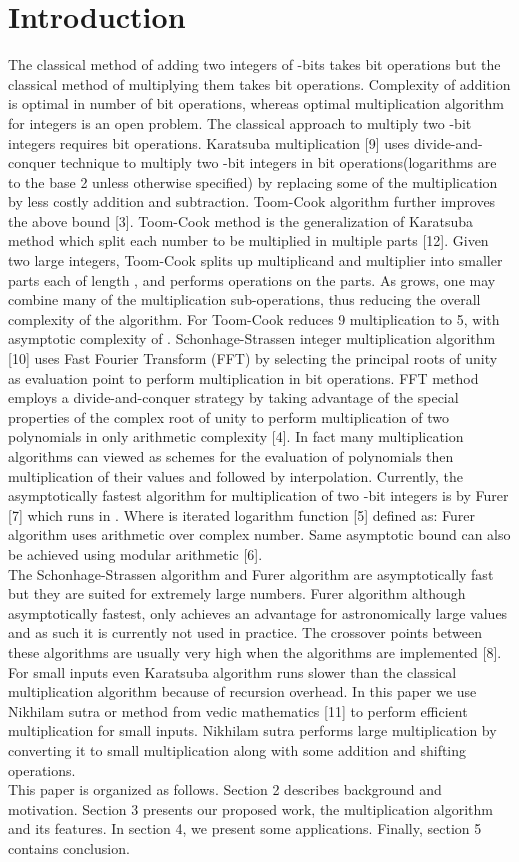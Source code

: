 \documentclass[conference]{IEEEtran}
\begin{document}
\section{Introduction}
The classical method of adding two integers of -bits takes  bit operations but the classical method of multiplying them takes  bit operations. Complexity of addition is optimal in number of bit operations, whereas optimal multiplication algorithm for integers is an open problem. The classical approach to multiply two -bit integers requires  bit operations. Karatsuba multiplication [9] uses divide-and-conquer technique to multiply two -bit integers in  bit operations(logarithms are to the base 2 unless otherwise specified) by replacing some of the multiplication by less costly addition and subtraction. Toom-Cook algorithm further improves the above bound [3]. Toom-Cook method is the generalization of Karatsuba method which split each number to be multiplied in multiple parts [12]. Given two large integers, Toom-Cook splits up multiplicand and multiplier into  smaller parts each of length , and performs operations on the parts. As  grows, one may combine many of the multiplication sub-operations, thus reducing the overall complexity of the algorithm. For  Toom-Cook reduces 9 multiplication to 5, with 
asymptotic complexity of . Schonhage-Strassen integer multiplication algorithm [10] uses Fast Fourier Transform (FFT) by selecting the principal roots of unity as evaluation point to perform multiplication in  bit operations. FFT method employs a divide-and-conquer strategy by taking advantage of the special properties of the complex root of unity to perform multiplication of two polynomials in only  arithmetic complexity [4]. In fact many multiplication algorithms can viewed as schemes for the evaluation of polynomials then multiplication of their values and followed by interpolation. Currently, the asymptotically fastest algorithm for multiplication of two -bit integers is by Furer [7] which runs in . Where  is iterated logarithm function [5] defined as: 
Furer algorithm uses arithmetic over complex number. Same asymptotic bound can also be achieved using modular arithmetic [6].\\
\indent The Schonhage-Strassen algorithm and Furer algorithm are asymptotically fast but they are suited for extremely large numbers. Furer algorithm although asymptotically fastest, only achieves an advantage for astronomically large values and as such it is currently not used in practice. The crossover points between these algorithms are usually very high when the algorithms are implemented [8].
For small inputs even Karatsuba algorithm runs slower than the classical multiplication algorithm because of recursion overhead. In this paper we use Nikhilam sutra or method from vedic mathematics [11] to perform efficient multiplication for small inputs. Nikhilam sutra performs large multiplication by converting it to small multiplication along with some addition and shifting operations. \\
\indent This paper is organized as follows. Section 2 describes background and motivation. Section 3 presents our proposed work, the multiplication algorithm and its features. In section 4, we present some applications. Finally, section 5 contains conclusion.
\end{document}

